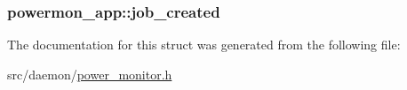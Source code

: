 \subsubsection[{\texorpdfstring{job\+\_\+created}{job_created}}]{ powermon\+\_\+app\+::job\+\_\+created}\hypertarget{structpowermon__app_a97f2d0fcd291e663fd239693441e8976}{}\label{structpowermon__app_a97f2d0fcd291e663fd239693441e8976}


The documentation for this struct was generated from the following file\+:\begin{DoxyCompactItemize}
\item 
src/daemon/\hyperlink{power__monitor_8h}{power\+\_\+monitor.\+h}\end{DoxyCompactItemize}
